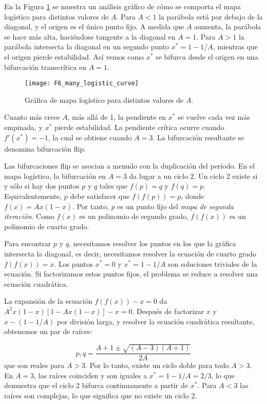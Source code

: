             En la Figura \ref{fig:F6_many_logistic_curve} se muestra un análisis gráfico de cómo se comporta el mapa logístico para distintos valores de $A$. Para $A < 1$ la parábola está por debajo de la diagonal, y el origen es el único punto fijo. A medida que $A$ aumenta, la parábola se hace más alta, haciéndose tangente a la diagonal en $A = 1$. Para $A > 1$ la parábola intersecta la diagonal en un segundo punto $x^{*} = 1 - 1/A$, mientras que el origen pierde estabilidad. Así vemos como $x^{*}$ se bifurca desde el origen en una bifurcación transcrítica en $A = 1$. 

            \begin{figure}[hbtp]
                \centering
                \texttt{[image: F6\_many\_logistic\_curve]}
                \caption{Gráfica de mapa logístico para distintos valores de $A$.}
                \label{fig:F6_many_logistic_curve}
            \end{figure}
            
            Cuanto más crece $A$, más allá de 1, la pendiente en $x^{*}$ se vuelve cada vez más empinada, y $x^{*}$ pierde estabilidad. La pendiente crítica ocurre cuando $f'(x^{*}) = -1$, la cual se obtiene cuando $A = 3$. La bifurcación resultante se denomina bifurcación flip.

            Las bifurcaciones flip se asocian a menudo con la duplicación del período. En el mapa logístico, la bifurcación en $A = 3$ da lugar a un ciclo 2. Un ciclo 2 existe si y sólo si hay dos puntos $p$ y $q$ tales que $f(p) = q$  y $f(q) = p$. Equivalentemente, $p$ debe satisfacer que $f(f(p)) = p$, donde $f(x) = Ax (1 - x)$. Por tanto, $p$ es un punto fijo del \emph{mapa de segunda iteración}. Como $f(x)$ es un polinomio de segundo grado, $f(f(x))$ es un polinomio de cuarto grado.

            Para encontrar $p$ y $q$, necesitamos resolver los puntos en los que la gráfica intersecta la diagonal, es decir, necesitamos resolver la ecuación de cuarto grado $f(f(x)) = x$. Los puntos $x^{*} = 0$ y $x^{*} = 1 - 1/A$ son soluciones triviales de la ecuación. Si factorizamos estos puntos fijos, el problema se reduce a resolver una ecuación cuadrática. 

            La expansión de la ecuación $f(f(x)) -x = 0$ da $A^{2}x(1-x) [1 - Ax(1-x)] -x = 0$. Después de factorizar $x$ y $x - (1-1/A)$ por división larga, y resolver la ecuación cuadrática resultante, obtenemos un par de raíces:

            \begin{equation}
                p,q = \frac{A + 1 \pm \sqrt{(A-3) (A+1)} }{2A} 
            \end{equation}
            que son reales para $A > 3$. Por lo tanto, existe un ciclo doble para todo $ A > 3 $. En $ A = 3 $, las raíces coinciden y son iguales a $x^{*} = 1 - 1/A = 2/3$, lo que demuestra que el ciclo 2 bifurca continuamente a partir de $x^{*}$. Para $A < 3$ las raíces son complejas, lo que significa que no existe un ciclo 2.


